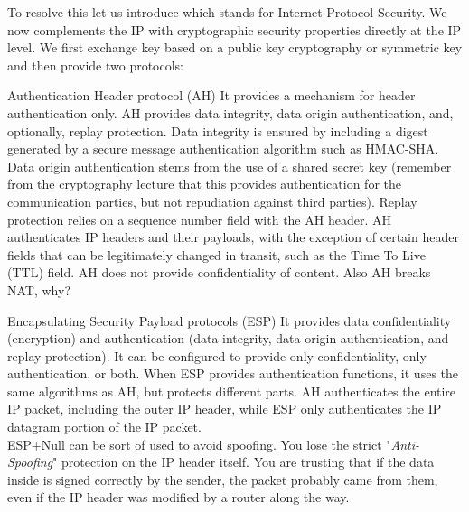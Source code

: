 To resolve this let us introduce  which stands for Internet Protocol Security. We now complements the IP with cryptographic security properties directly at the IP level. We first exchange key based on a public key cryptography or symmetric key and then provide two protocols:
\begin{parag}{Authentication Header protocol (AH)}
    It provides a mechanism for header authentication only. AH provides data integrity, data origin authentication, and, optionally, replay protection. Data integrity is ensured by including a digest generated by a secure message authentication algorithm such as HMAC-SHA. Data origin authentication stems from the use of a shared secret key (remember from the cryptography lecture that this provides authentication for the communication parties, but not repudiation against third parties). Replay protection relies on a sequence number field with the AH header. AH authenticates IP headers and their payloads, with the exception of certain header fields that can be legitimately changed in transit, such as the Time To Live (TTL) field. AH does not provide confidentiality of content. Also AH breaks NAT, why?
\end{parag}


\begin{parag}{Encapsulating Security Payload protocols (ESP)}
    It provides data confidentiality (encryption) and authentication (data integrity, data origin authentication, and replay protection). It can be configured to provide only confidentiality, only authentication, or both. When ESP provides authentication functions, it uses the same algorithms as AH, but protects different parts. AH authenticates the entire IP packet, including the outer IP header, while ESP only authenticates the IP datagram portion of the IP packet.\\

	ESP+Null can be sort of used to avoid spoofing. You lose the strict "\textit{Anti-Spoofing}" protection on the IP header itself. You are trusting that if the data inside is signed correctly by the sender, the packet probably came from them, even if the IP header was modified by a router along the way.
\end{parag}

